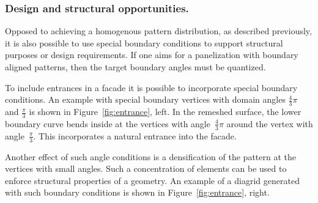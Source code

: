 \documentclass[article.tex]{subfiles}
\begin{document}
\subsubsection{Design and structural opportunities.}
Opposed to achieving a homogenous pattern distribution, as described
previously, it is also possible to use special boundary conditions to
support structural purposes or design requirements. If one aims for a
panelization with boundary aligned patterns, then the target boundary
angles must be quantized.

To include entrances in a facade it is possible to incorporate special 
boundary conditions. An example with special boundary vertices with domain angles
$\frac{4}{3}\pi$ and $\tfrac{\pi}{3}$ is shown in
Figure~\ref{fig:entrance}, left. In the remeshed surface, the lower boundary
curve bends inside at the vertices with angle~$\tfrac{4}{3}\pi$ around
the vertex with angle~$\tfrac{\pi}{3}$. This incorporates a natural
entrance into the facade.

Another effect of such angle conditions is a densification of the
pattern at the vertices with small angles. Such a concentration of
elements can be used to enforce structural properties of a
geometry. An example of a diagrid generated with such boundary
conditions is shown in Figure~\ref{fig:entrance}, right.
\end{document}
